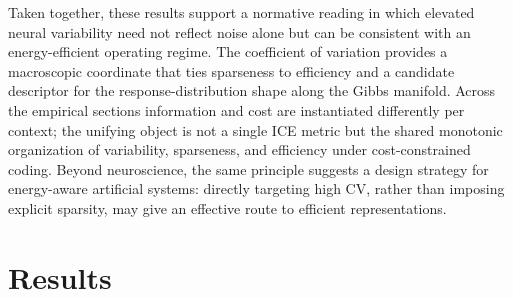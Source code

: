 \documentclass[sn-basic,Numbered]{sn-jnl}%
\theoremstyle{thmstyleone}%
\theoremstyle{thmstyletwo}%
\theoremstyle{thmstylethree}%
\begin{document}
Taken together, these results support a normative reading in which elevated neural variability need not reflect noise alone but can be consistent with an energy-efficient operating regime. The coefficient of variation provides a macroscopic coordinate that ties sparseness to efficiency and a candidate descriptor for the response-distribution shape along the Gibbs manifold. Across the empirical sections information and cost are instantiated differently per context; the unifying object is not a single ICE metric but the shared monotonic organization of variability, sparseness, and efficiency under cost-constrained coding. Beyond neuroscience, the same principle suggests a design strategy for energy-aware artificial systems: directly targeting high CV, rather than imposing explicit sparsity, may give an effective route to efficient representations.

\section{Results}
\label{results}












\backmatter
\end{document}
